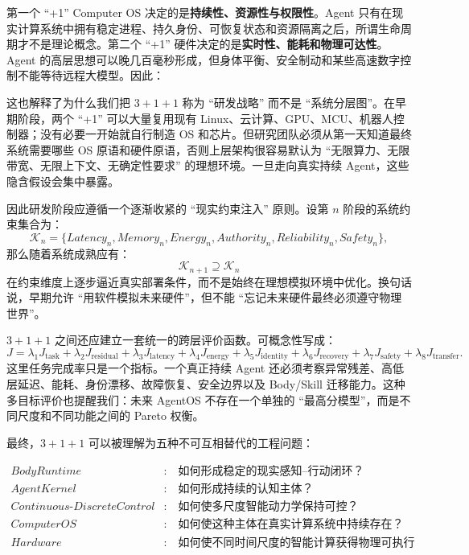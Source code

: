 第一个 ``+1'' Computer OS 决定的是\textbf{持续性、资源性与权限性}。Agent 只有在现实计算系统中拥有稳定进程、持久身份、可恢复状态和资源隔离之后，所谓生命周期才不是理论概念。第二个 ``+1'' 硬件决定的是\textbf{实时性、能耗和物理可达性}。Agent 的高层思想可以晚几百毫秒形成，但身体平衡、安全制动和某些高速数字控制不能等待远程大模型。因此：
\begin{statementbox}
\centering
{}
\end{statementbox}

这也解释了为什么我们把 $3+1+1$ 称为 ``研发战略'' 而不是 ``系统分层图''。在早期阶段，两个 ``+1'' 可以大量复用现有 Linux、云计算、GPU、MCU、机器人控制器；没有必要一开始就自行制造 OS 和芯片。但研究团队必须从第一天知道最终系统需要哪些 OS 原语和硬件原语，否则上层架构很容易默认为 ``无限算力、无限带宽、无限上下文、无确定性要求'' 的理想环境。一旦走向真实持续 Agent，这些隐含假设会集中暴露。

因此研发阶段应遵循一个逐渐收紧的 ``现实约束注入'' 原则。设第 $n$ 阶段的系统约束集合为：
\[
\mathcal K_n
=
\{
Latency_n,
Memory_n,
Energy_n,
Authority_n,
Reliability_n,
Safety_n
\},
\]
那么随着系统成熟应有：
\[
\mathcal K_{n+1}
\supseteq
\mathcal K_n
\]
在约束维度上逐步逼近真实部署条件，而不是始终在理想模拟环境中优化。换句话说，早期允许 ``用软件模拟未来硬件''，但不能 ``忘记未来硬件最终必须遵守物理世界''。

$3+1+1$ 之间还应建立一套统一的跨层评价函数。可概念性写成：
\[
J
=
\lambda_1J_{\mathrm{task}}
+
\lambda_2J_{\mathrm{residual}}
+
\lambda_3J_{\mathrm{latency}}
+
\lambda_4J_{\mathrm{energy}}
+
\lambda_5J_{\mathrm{identity}}
+
\lambda_6J_{\mathrm{recovery}}
+
\lambda_7J_{\mathrm{safety}}
+
\lambda_8J_{\mathrm{transfer}}.
\]
这里任务完成率只是一个指标。一个真正持续 Agent 还必须考察异常残差、高低层延迟、能耗、身份漂移、故障恢复、安全边界以及 Body/Skill 迁移能力。这种多目标评价也提醒我们：未来 AgentOS 不存在一个单独的 ``最高分模型''，而是不同尺度和不同功能之间的 Pareto 权衡。

最终，$3+1+1$ 可以被理解为五种不可互相替代的工程问题：

\[
\begin{aligned}
BodyRuntime &: \quad
\text{如何形成稳定的现实感知--行动闭环？}\\
AgentKernel &: \quad
\text{如何形成持续的认知主体？}\\
Continuous\text{-}DiscreteControl &: \quad
\text{如何使多尺度智能动力学保持可控？}\\
ComputerOS &: \quad
\text{如何使这种主体在真实计算系统中持续存在？}\\
Hardware &: \quad
\text{如何使不同时间尺度的智能计算获得物理可执行性？}
\end{aligned}
\]

